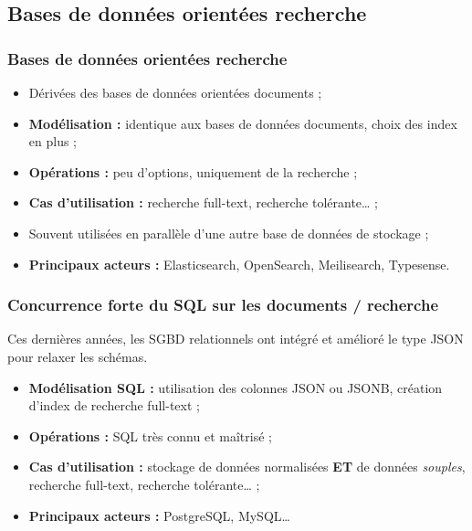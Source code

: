     \subsection{Bases de données orientées recherche}
    \begin{frame}
        \frametitle{Bases de données orientées recherche}

        \begin{itemize}
            \item Dérivées des bases de données orientées documents ;
            \item \textbf{Modélisation :} identique aux bases de données documents, choix des index en plus ;
            \item \textbf{Opérations :} peu d'options, uniquement de la recherche ;
            \item \textbf{Cas d'utilisation :} recherche full-text, recherche tolérante… ;
            \item Souvent utilisées en parallèle d'une autre base de données de stockage ;
            \item \textbf{Principaux acteurs :} Elasticsearch, OpenSearch, Meilisearch, Typesense.
        \end{itemize}
    \end{frame}

    \begin{frame}
        \frametitle{Concurrence forte du SQL sur les documents / recherche}

        \vspace{15px}
        Ces dernières années, les SGBD relationnels ont intégré et amélioré le type JSON pour relaxer les schémas.
        \vspace{5px}

        \begin{itemize}
            \item \textbf{Modélisation SQL :} utilisation des colonnes JSON ou JSONB, création d'index de recherche full-text ;
            \item \textbf{Opérations :} SQL très connu et maîtrisé ;
            \item \textbf{Cas d'utilisation :} stockage de données normalisées \textbf{ET} de données \textit{souples}, recherche full-text, recherche tolérante… ;
            \item \textbf{Principaux acteurs :} PostgreSQL, MySQL…
        \end{itemize}
    \end{frame}

